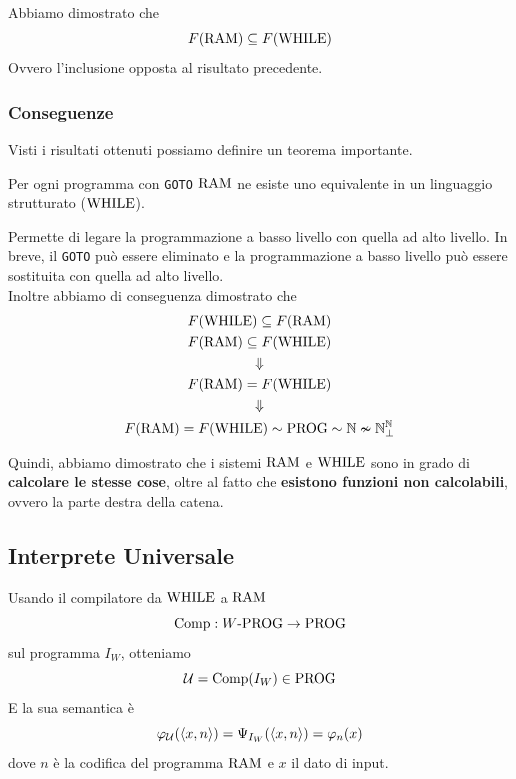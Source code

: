 Abbiamo dimostrato che
$$ F(\text{RAM}) \subseteq F(\text{WHILE}) $$
Ovvero l'inclusione opposta al risultato precedente.\\

\subsubsection{Conseguenze}
Visti i risultati ottenuti possiamo definire un teorema importante.\\

\begin{theor}
	Per ogni programma con \texttt{GOTO} $\text{RAM}$ ne esiste uno equivalente in un linguaggio strutturato ($\text{WHILE}$).\\
\end{theor}

Permette di legare la programmazione a basso livello con quella ad alto livello. In breve, il \texttt{GOTO} può essere eliminato e la programmazione a basso livello può essere sostituita con quella ad alto livello.\\

Inoltre abbiamo di conseguenza dimostrato che
\begin{gather*}
	F(\text{WHILE}) \subseteq F(\text{RAM}) \\
	F (\text{RAM}) \subseteq F(\text{WHILE}) \\
	\Downarrow \\
	F(\text{RAM}) = F(\text{WHILE}) \\
	\Downarrow \\
	F(\text{RAM}) = F(\text{WHILE}) \sim \text{PROG} \sim \mathbb{N} \nsim \mathbb{N}^{\mathbb{N}}_\bot
\end{gather*}

Quindi, abbiamo dimostrato che i sistemi $\text{RAM}$ e $\text{WHILE}$ sono in grado di \textbf{calcolare le stesse cose}, oltre al fatto che \textbf{esistono funzioni non calcolabili}, ovvero la parte destra della catena. \\

\subsection{Interprete Universale}
Usando il compilatore da $\text{WHILE}$ a $\text{RAM}$
$$ \text{Comp}: W\text{-PROG} \rightarrow \text{PROG} $$
sul programma $I_W$, otteniamo
$$ \mathcal{U} = \text{Comp}(I_W) \in \text{PROG} $$
E la sua semantica è 
$$ \varphi_{\mathcal{U}} (\langle x,n \rangle) = \Psi_{I_W} (\langle x,n \rangle) = \varphi_n (x) $$
dove $n$ è la codifica del programma $\text{RAM}$ e $x$ il dato di input.\\

